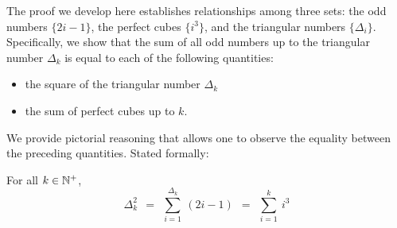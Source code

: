 \smallskip

The proof we develop here establishes relationships among three sets: the odd numbers $\{2i-1\}$, the perfect cubes $\{i^3\}$, and the triangular numbers $\{ \Delta_i \}$.  Specifically, we show that the sum of all odd numbers up to the triangular number $\Delta_k$ is equal to each of the following quantities:
\begin{itemize}
\item
the square of the triangular number $\Delta_k$
\medskip\item
the sum of perfect cubes up to $k$.
\end{itemize}
We provide pictorial reasoning that allows one to observe the equality between the preceding quantities.  Stated formally:

\begin{prop}
\label{thm:odds-sum2-cubes}
For all $k \in \mathbb{N}^+$,
\begin{equation}
\label{eq:sum-odds=Delta-sq=sum-cubes}
\Delta_k^2 \ \  = \ \
\sum_{i=1}^{\Delta_k} \ (2i-1)  \ \ =  \ \ \sum_{i=1}^k \ i^3
\end{equation}
\end{prop}


